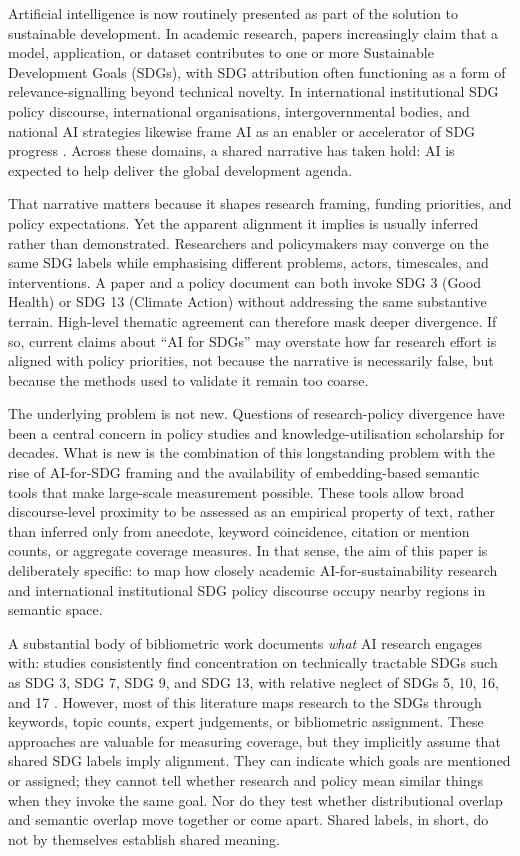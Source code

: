 \documentclass[12pt,a4paper]{article}
\begin{document}
Artificial intelligence is now routinely presented as part of the solution to sustainable development. In academic research, papers increasingly claim that a model, application, or dataset contributes to one or more Sustainable Development Goals (SDGs), with SDG attribution often functioning as a form of relevance-signalling beyond technical novelty. In international institutional SDG policy discourse, international organisations, intergovernmental bodies, and national AI strategies likewise frame AI as an enabler or accelerator of SDG progress \parencite{UN2015, OECD2019, UNESCO2021, UKAI2021, UNAI2024}. Across these domains, a shared narrative has taken hold: AI is expected to help deliver the global development agenda.

That narrative matters because it shapes research framing, funding priorities, and policy expectations. Yet the apparent alignment it implies is usually inferred rather than demonstrated. Researchers and policymakers may converge on the same SDG labels while emphasising different problems, actors, timescales, and interventions. A paper and a policy document can both invoke SDG 3 (Good Health) or SDG 13 (Climate Action) without addressing the same substantive terrain. High-level thematic agreement can therefore mask deeper divergence. If so, current claims about ``AI for SDGs'' may overstate how far research effort is aligned with policy priorities, not because the narrative is necessarily false, but because the methods used to validate it remain too coarse.

The underlying problem is not new. Questions of research-policy divergence have been a central concern in policy studies and knowledge-utilisation scholarship for decades. What is new is the combination of this longstanding problem with the rise of AI-for-SDG framing and the availability of embedding-based semantic tools that make large-scale measurement possible. These tools allow broad discourse-level proximity to be assessed as an empirical property of text, rather than inferred only from anecdote, keyword coincidence, citation or mention counts, or aggregate coverage measures. In that sense, the aim of this paper is deliberately specific: to map how closely academic AI-for-sustainability research and international institutional SDG policy discourse occupy nearby regions in semantic space.

A substantial body of bibliometric work documents \emph{what} AI research engages with: studies consistently find concentration on technically tractable SDGs such as SDG 3, SDG 7, SDG 9, and SDG 13, with relative neglect of SDGs 5, 10, 16, and 17 \parencite{Vinuesa2020, Singh2024, Cowls2021}. However, most of this literature maps research to the SDGs through keywords, topic counts, expert judgements, or bibliometric assignment. These approaches are valuable for measuring coverage, but they implicitly assume that shared SDG labels imply alignment. They can indicate which goals are mentioned or assigned; they cannot tell whether research and policy mean similar things when they invoke the same goal. Nor do they test whether distributional overlap and semantic overlap move together or come apart. Shared labels, in short, do not by themselves establish shared meaning.
\end{document}
